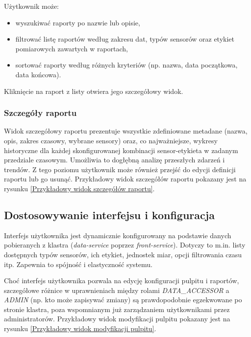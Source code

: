 Użytkownik może:

\begin{itemize}
    \item wyszukiwać raporty po nazwie lub opisie,
    \item filtrować listę raportów według zakresu dat, typów sensorów oraz etykiet pomiarowych zawartych w raportach,
    \item sortować raporty według różnych kryteriów (np. nazwa, data początkowa, data końcowa).
\end{itemize}

Kliknięcie na raport z listy otwiera jego szczegółowy widok.



\subsubsection{Szczegóły raportu}
Widok szczegółowy raportu prezentuje wszystkie zdefiniowane metadane (nazwa, opis, zakres czasowy, wybrane sensory) oraz, co najważniejsze, wykresy historyczne dla każdej skonfigurowanej kombinacji sensor-etykieta w zadanym przedziale czasowym. Umożliwia to dogłębną analizę przeszłych zdarzeń i trendów. Z tego poziomu użytkownik może również przejść do edycji definicji raportu lub go usunąć. Przykładowy widok szczegółów raportu pokazany jest na rysunku \ref{Przykładowy widok szczegółów raportu}.


\subsection{Dostosowywanie interfejsu i konfiguracja}
Interfejs użytkownika jest dynamicznie konfigurowany na podstawie danych pobieranych z klastra (\textit{data-service} poprzez \textit{front-service}). Dotyczy to m.in. listy dostępnych typów sensorów, ich etykiet, jednostek miar, opcji filtrowania czasu itp. Zapewnia to spójność i elastyczność systemu.

Choć interfejs użytkownika pozwala na edycję konfiguracji pulpitu i raportów, szczegółowe różnice w uprawnieniach między rolami \textit{DATA\_ACCESSOR} a \textit{ADMIN} (np. kto może zapisywać zmiany) są prawdopodobnie egzekwowane po stronie klastra, poza wspomnianym już zarządzaniem użytkownikami przez administratorów. Przykładowy widok modyfikacji pulpitu pokazany jest na rysunku \ref{Przykładowy widok modyfikacji pulpitu}.


